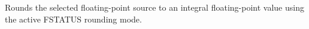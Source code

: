 Rounds the selected floating-point source to an integral floating-point value using the active FSTATUS rounding mode.
